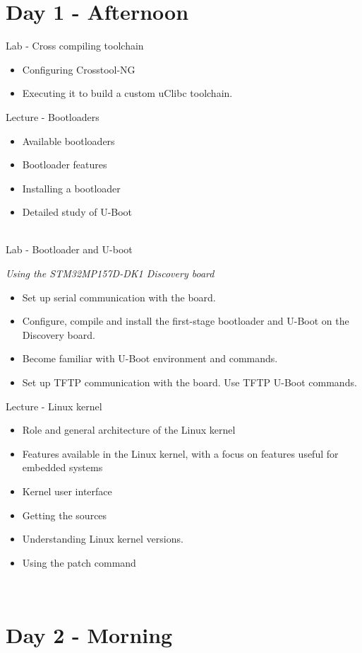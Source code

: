 \documentclass[a4paper,12pt,obeyspaces,spaces,hyphens]{article}
\begin{document}
\section{Day 1 - Afternoon}
\feagendatwocolumn
{Lab - Cross compiling toolchain}
{
  \begin{itemize}
  \item Configuring Crosstool-NG
  \item Executing it to build a custom uClibc toolchain.
  \end{itemize}
}
{Lecture - Bootloaders}
{
  \begin{itemize}
  \item Available bootloaders
  \item Bootloader features
  \item Installing a bootloader
  \item Detailed study of U-Boot
  \end{itemize}
}
\\

\feagendatwocolumn
{Lab - Bootloader and U-boot}
{
  {\em Using the STM32MP157D-DK1 Discovery board}
  \begin{itemize}
  \item Set up serial communication with the board.
  \item Configure, compile and install the first-stage bootloader
        and U-Boot on the Discovery board.
  \item Become familiar with U-Boot environment and commands.
  \item Set up TFTP communication with the board. Use TFTP U-Boot commands.
  \end{itemize}
}
{Lecture - Linux kernel}
{
  \begin{itemize}
  \item Role and general architecture of the Linux kernel
  \item Features available in the Linux kernel,
        with a focus on features useful for embedded systems
  \item Kernel user interface
  \item Getting the sources
  \item Understanding Linux kernel versions.
  \item Using the patch command
  \end{itemize}
}
\\

\section{Day 2 - Morning}
\end{document}
